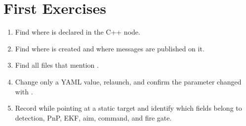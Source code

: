 \section{First Exercises}

\begin{enumerate}
  \item Find where  is declared in the C++ node.
  \item Find where  is created and where messages
  are published on it.
  \item Find all files that mention .
  \item Change only a YAML value, relaunch, and confirm the parameter changed
  with .
  \item Record  while pointing at a static target and
  identify which fields belong to detection, PnP, EKF, aim, command, and fire
  gate.
\end{enumerate}
